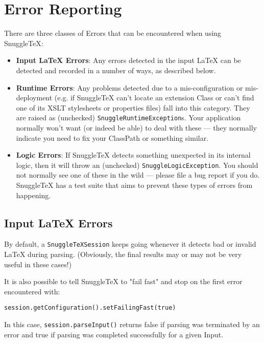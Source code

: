 
\section*{Error Reporting}

There are three classes of Errors that can be encountered when using SnuggleTeX:

\begin{itemize}

\item \textbf{Input LaTeX Errors}: Any errors detected in the input LaTeX can
  be detected and recorded in a number of ways, as described below.

\item \textbf{Runtime Errors}: Any problems detected due to a mis-configuration
  or mis-deployment (e.g. if SnuggleTeX can't locate an extension Class or can't
  find one of its XSLT stylesheets or properties files) fall into this category.
  They are raised as (unchecked) \verb|SnuggleRuntimeException|s. Your application
  normally won't want (or indeed be able) to deal with these --- they normally
  indicate you need to fix your ClassPath or something similar.

\item \textbf{Logic Errors}: If SnuggleTeX detects something unexpected in its
  internal logic, then it will throw an (unchecked) \verb|SnuggleLogicException|.
  You should not normally see one of these in the wild --- please file a bug report
  if you do. SnuggleTeX has a test suite that aims to prevent these types of errors
  from happening.
\end{itemize}

\subsection*{Input LaTeX Errors}

By default, a \verb|SnuggleTeXSession| keeps going whenever it detects bad or
invalid LaTeX during parsing.
(Obviously, the final results may or may not be very useful in these cases!)

It is also possible to tell SnuggleTeX to "fail fast" and stop on the first error
encountered with:
\begin{verbatim}session.getConfiguration().setFailingFast(true)\end{verbatim}
In this case, \verb|session.parseInput()| returns false if parsing was
terminated by an error and true if parsing was completed successfully for
a given Input.

